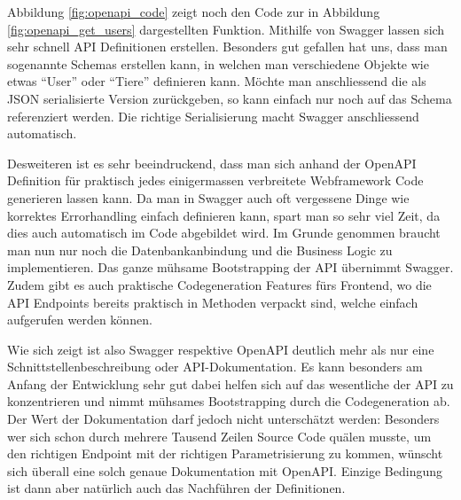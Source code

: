 Abbildung \ref{fig:openapi_code} zeigt noch den Code zur in Abbildung \ref{fig:openapi_get_users} dargestellten Funktion.
Mithilfe von Swagger lassen sich sehr schnell API Definitionen erstellen. Besonders gut gefallen hat uns, dass man sogenannte
Schemas erstellen kann, in welchen man verschiedene Objekte wie etwas ``User'' oder ``Tiere'' definieren kann. Möchte man anschliessend
die als JSON serialisierte Version zurückgeben, so kann einfach nur noch auf das Schema referenziert werden. Die richtige Serialisierung
macht Swagger anschliessend automatisch.

Desweiteren ist es sehr beeindruckend, dass man sich anhand der OpenAPI Definition für praktisch jedes einigermassen verbreitete Webframework
Code generieren lassen kann. Da man in Swagger auch oft vergessene Dinge wie korrektes Errorhandling einfach definieren kann, spart man so
sehr viel Zeit, da dies auch automatisch im Code abgebildet wird. Im Grunde genommen braucht man nun nur noch die Datenbankanbindung und die Business
Logic zu implementieren. Das ganze mühsame Bootstrapping der API übernimmt Swagger. Zudem gibt es auch praktische Codegeneration Features fürs Frontend,
wo die API Endpoints bereits praktisch in Methoden verpackt sind, welche einfach aufgerufen werden können.

Wie sich zeigt ist also Swagger respektive OpenAPI deutlich mehr als nur eine Schnittstellenbeschreibung oder API-Dokumentation. Es kann
besonders am Anfang der Entwicklung sehr gut dabei helfen sich auf das wesentliche der API zu konzentrieren und nimmt mühsames Bootstrapping durch die
Codegeneration ab. Der Wert der Dokumentation darf jedoch nicht unterschätzt werden: Besonders wer sich schon durch mehrere Tausend Zeilen Source Code
quälen musste, um den richtigen Endpoint mit der richtigen Parametrisierung zu kommen, wünscht sich überall eine solch genaue Dokumentation mit OpenAPI.
Einzige Bedingung ist dann aber natürlich auch das Nachführen der Definitionen.

